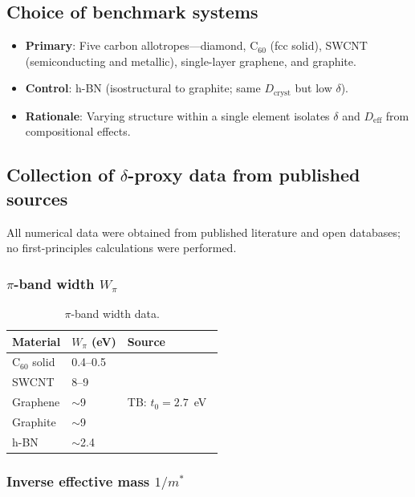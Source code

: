 \documentclass[twocolumn,showpacs,preprintnumbers,amsmath,amssymb,prb]{revtex4-2}
\begin{document}
\subsection{Choice of benchmark systems}

\begin{itemize}
  \item \textbf{Primary}: Five carbon allotropes---diamond,
    C$_{60}$ (fcc solid), SWCNT (semiconducting and metallic),
    single-layer graphene, and graphite.
  \item \textbf{Control}: h-BN (isostructural to graphite; same
    $D_\mathrm{cryst}$ but low $\delta$).
  \item \textbf{Rationale}: Varying structure within a single element
    isolates $\delta$ and $D_\mathrm{eff}$ from compositional effects.
\end{itemize}

\subsection{Collection of $\delta$-proxy data from published sources}

All numerical data were obtained from published literature and open
databases; no first-principles calculations were performed.

\subsubsection{$\pi$-band width $W_\pi$}

\begin{table}[h]
\caption{$\pi$-band width data.}
\label{tab:bandwidth}
\begin{ruledtabular}
\begin{tabular}{lll}
  Material & $W_\pi$ (eV) & Source \\
  \hline
  C$_{60}$ solid & 0.4--0.5 & \cite{Gunnarsson1997} \\
  SWCNT & 8--9 & \cite{Reich2002} \\
  Graphene & $\sim$9 & TB: $t_0 = 2.7$~eV~\cite{Saito1998} \\
  Graphite & $\sim$9 & \cite{Reich2002} \\
  h-BN & $\sim$2.4 & \cite{Wirtz2005} \\
\end{tabular}
\end{ruledtabular}
\end{table}

\subsubsection{Inverse effective mass $1/m^*$}
\end{document}
